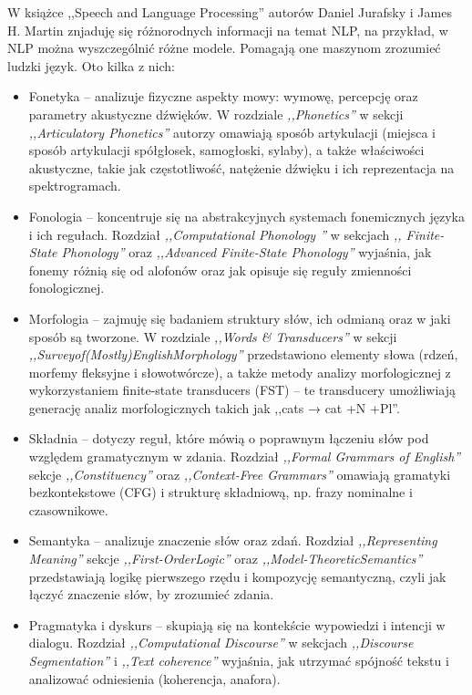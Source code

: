 \documentclass[wmii, inf, mgr]{uwmthesis}
\begin{document}
W książce ,,Speech and Language Processing'' \cite{SpeechandLanguageProcessing} autorów Daniel Jurafsky i James H. Martin znjaduję się różnorodnych informacji na temat NLP, na przykład, w NLP można wyszczególnić różne modele. Pomagają one maszynom zrozumieć ludzki język. Oto kilka z nich:
\begin{itemize}
    \item {Fonetyka} -- analizuje fizyczne aspekty mowy: wymowę, percepcję oraz parametry akustyczne dźwięków. W rozdziale \textit{,,Phonetics''} w sekcji \textit{,,Articulatory Phonetics''} \cite{SpeechandLanguageProcessing} autorzy omawiają sposób artykulacji (miejsca i sposób artykulacji spółgłosek, samogłoski, sylaby), a także właściwości akustyczne, takie jak częstotliwość, natężenie dźwięku i ich reprezentacja na spektrogramach.
    \item {Fonologia} -- koncentruje się na abstrakcyjnych systemach fonemicznych języka i ich regułach. Rozdział \textit{,,Computational Phonology ''} w sekcjach \textit{,, Finite-State Phonology''} oraz \textit{,,Advanced Finite-State Phonology''} \cite{SpeechandLanguageProcessing} wyjaśnia, jak fonemy różnią się od alofonów oraz jak opisuje się reguły zmienności fonologicznej.
    \item {Morfologia} -- zajmuję się badaniem struktury słów, ich odmianą oraz w jaki sposób są tworzone. W rozdziale \textit{,,Words \& Transducers''} \cite{SpeechandLanguageProcessing} w sekcji \textit{,,Surveyof(Mostly)EnglishMorphology''} przedstawiono elementy słowa (rdzeń, morfemy fleksyjne i słowotwórcze), a także metody analizy morfologicznej z wykorzystaniem finite-state transducers (FST) -- te transducery umożliwiają generację analiz morfologicznych takich jak ,,cats → cat +N +Pl''. 
    \item {Składnia} -- dotyczy reguł, które mówią o poprawnym łączeniu słów pod względem gramatycznym w zdania. Rozdział \textit{,,Formal Grammars of English''} \cite{SpeechandLanguageProcessing} sekcje \textit{,,Constituency''} oraz \textit{,,Context-Free Grammars''} omawiają gramatyki bezkontekstowe (CFG) i strukturę składniową, np. frazy nominalne i czasownikowe.
    \item{Semantyka} -- analizuje znaczenie słów oraz zdań. Rozdział \textit{,,Representing Meaning''} \cite{NaturalLanguageProcessing} sekcje \textit{,,First-OrderLogic''} oraz \textit{,,Model-TheoreticSemantics''} przedstawiają logikę pierwszego rzędu i kompozycję semantyczną, czyli jak łączyć znaczenie słów, by zrozumieć zdania.
    \item {Pragmatyka i dyskurs} -- skupiają się na kontekście wypowiedzi i intencji w dialogu. Rozdział \textit{,,Computational Discourse''} \cite{SpeechandLanguageProcessing} w sekcjach \textit{,,Discourse Segmentation''} i \textit{,,Text coherence''} wyjaśnia, jak utrzymać spójność tekstu i analizować odniesienia (koherencja, anafora).
\end{itemize}
\end{document}
